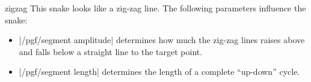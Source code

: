\begin{snake}{zigzag}
  This snake looks like a zig-zag line. The following parameters
  influence the snake:
  \begin{itemize}
  \item |/pgf/segment amplitude|
    determines how much the zig-zag lines raises above and falls below
    a straight line to the target point.
  \item |/pgf/segment length|
    determines the length of a complete ``up-down'' cycle.
  \end{itemize}
\begin{codeexample}[]
\end{codeexample}
\end{snake}



